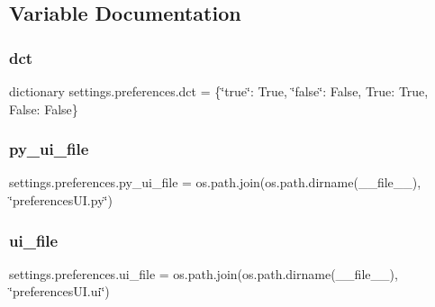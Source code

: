 \subsection{Variable Documentation}
\hypertarget{a00059_a733f21e501f603b086934c865c62d41d}{}\label{a00059_a733f21e501f603b086934c865c62d41d} 
\subsubsection{\texorpdfstring{dct}{dct}}
{\footnotesize\ttfamily dictionary settings.\+preferences.\+dct = \{\char`\"{}true\char`\"{}\+: True, \char`\"{}false\char`\"{}\+: False, True\+: True, False\+: False\}}

\hypertarget{a00059_ae7e022019493035187806fac02749517}{}\label{a00059_ae7e022019493035187806fac02749517} 
\subsubsection{\texorpdfstring{py\+\_\+ui\+\_\+file}{py\_ui\_file}}
{\footnotesize\ttfamily settings.\+preferences.\+py\+\_\+ui\+\_\+file = os.\+path.\+join(os.\+path.\+dirname(\+\_\+\+\_\+file\+\_\+\+\_\+), \char`\"{}preferences\+U\+I.\+py\char`\"{})}

\hypertarget{a00059_a033eb50e8b7b2de7816c6e423cf89fa2}{}\label{a00059_a033eb50e8b7b2de7816c6e423cf89fa2} 
\subsubsection{\texorpdfstring{ui\+\_\+file}{ui\_file}}
{\footnotesize\ttfamily settings.\+preferences.\+ui\+\_\+file = os.\+path.\+join(os.\+path.\+dirname(\+\_\+\+\_\+file\+\_\+\+\_\+), \char`\"{}preferences\+U\+I.\+ui\char`\"{})}

